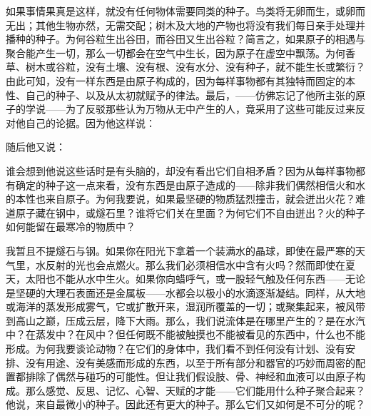 如果事情果真是这样，就没有任何物体需要同类的种子。鸟类将无卵而生，或卵而无出；其他生物亦然，无需交配；树木及大地的产物也将没有我们每日亲手处理并播种的种子。为何谷粒生出谷田，而谷田又生出谷粒？简言之，如果原子的相遇与聚合能产生一切，那么一切都会在空气中生长，因为原子在虚空中飘荡。为何香草、树木或谷粒，没有土壤、没有根、没有水分、没有种子，就不能生长或繁衍？由此可知，没有一样东西是由原子构成的，因为每样事物都有其独特而固定的本性、自己的种子、以及从太初就赋予的律法。最后，——仿佛忘记了他所主张的原子的学说——为了反驳那些认为万物从无中产生的人，竟采用了这些可能反过来反对他自己的论据。因为他这样说：\par

\par

随后他又说：\par

\par

谁会想到他说这些话时是有头脑的，却没有看出它们自相矛盾？因为从每样事物都有确定的种子这一点来看，没有东西是由原子造成的——除非我们偶然相信火和水的本性也来自原子。为何我要说，如果最坚硬的物质猛烈撞击，就会迸出火花？难道原子藏在钢中，或燧石里？谁将它们关在里面？为何它们不自由迸出？火的种子如何能留在最寒冷的物质中？\par

我暂且不提燧石与钢。如果你在阳光下拿着一个装满水的晶球，即使在最严寒的天气里，水反射的光也会点燃火。那么我们必须相信水中含有火吗？然而即使在夏天，太阳也不能从水中生火。如果你向蜡呼气，或一股轻气触及任何东西——无论是坚硬的大理石表面还是金属板——水都会以极小的水滴逐渐凝结。同样，从大地或海洋的蒸发形成雾气，它或扩散开来，湿润所覆盖的一切；或聚集起来，被风带到高山之巅，压成云层，降下大雨。那么，我们说流体是在哪里产生的？是在水汽中？在蒸发中？在风中？但任何既不能被触摸也不能被看见的东西中，什么也不能形成。为何我要谈论动物？在它们的身体中，我们看不到任何没有计划、没有安排、没有用途、没有美感而形成的东西，以至于所有部分和器官的巧妙而周密的配置都排除了偶然与碰巧的可能性。但让我们假设肢、骨、神经和血液可以由原子构成。那么感觉、反思、记忆、心智、天赋的才能——它们能用什么种子聚合起来？他说，来自最微小的种子。因此还有更大的种子。那么它们又如何是不可分的呢？\par

